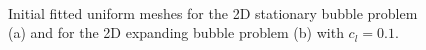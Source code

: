 \documentclass[a4paper,12pt,onecolumn]{article}
\begin{document}
\begin{figure}[htbp]
  \centering
  \quad
  \\
  \caption{Initial fitted uniform meshes for the 2D stationary bubble problem (a) and for the 2D expanding bubble problem (b) with $c_l=0.1$.}
  \label{fig:meshes_uniform}
\end{figure}
\end{document}
